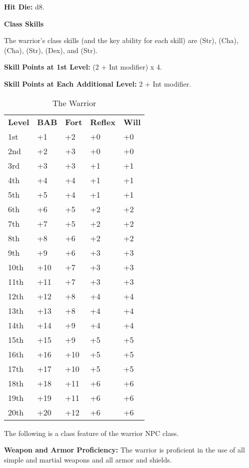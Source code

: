 
\textbf{Hit Die:} d8.

\textbf{Class Skills}

The warrior's class skills (and the key ability for each skill) are  (Str), 
 (Cha),  (Cha),  (Str),  (Dex), and  (Str).

\textbf{Skill Points at 1st Level:} (2 + Int modifier) x 4.

\textbf{Skill Points at Each Additional Level:} 2 + Int modifier.

\begin{table}[htb]
\caption{The Warrior}
\centering
\begin{tabular}{*{5}{l}}
\textbf{Level} & \textbf{BAB} & \textbf{Fort} & \textbf{Reflex} & \textbf{Will}\\
1st & +1 & +2 & +0 & +0 \\
2nd & +2 & +3 & +0 & +0 \\
3rd & +3 & +3 & +1 & +1 \\
4th & +4 & +4 & +1 & +1 \\
5th & +5 & +4 & +1 & +1 \\
6th & +6 & +5 & +2 & +2 \\
7th & +7 & +5 & +2 & +2 \\
8th & +8 & +6 & +2 & +2 \\
9th & +9 & +6 & +3 & +3 \\
10th & +10 & +7 & +3 & +3 \\
11th & +11 & +7 & +3 & +3 \\
12th & +12 & +8 & +4 & +4 \\
13th & +13 & +8 & +4 & +4 \\
14th & +14 & +9 & +4 & +4 \\
15th & +15 & +9 & +5 & +5 \\
16th & +16 & +10 & +5 & +5 \\
17th & +17 & +10 & +5 & +5 \\
18th & +18 & +11 & +6 & +6 \\
19th & +19 & +11 & +6 & +6 \\
20th & +20 & +12 & +6 & +6 \\
\end{tabular}
\end{table}

\ClassFeatures

The following is a class feature of the warrior NPC class.

\textbf{Weapon and Armor Proficiency:} The warrior is proficient in the use of 
all simple and martial weapons and all armor and shields.
